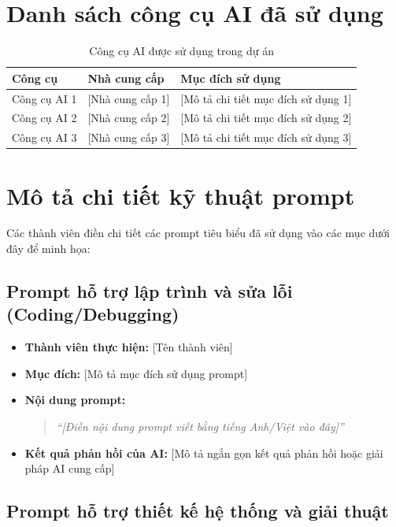 \documentclass[a4paper,12pt]{report}
\begin{document}
\section{Danh sách công cụ AI đã sử dụng}

\begin{table}[H]
\centering
\caption{Công cụ AI được sử dụng trong dự án}
\begin{tabular}{l l p{7cm}}
\toprule
\textbf{Công cụ} & \textbf{Nhà cung cấp} & \textbf{Mục đích sử dụng} \\
\midrule
Công cụ AI 1 & [Nhà cung cấp 1] & [Mô tả chi tiết mục đích sử dụng 1] \\
Công cụ AI 2 & [Nhà cung cấp 2] & [Mô tả chi tiết mục đích sử dụng 2] \\
Công cụ AI 3 & [Nhà cung cấp 3] & [Mô tả chi tiết mục đích sử dụng 3] \\
\bottomrule
\end{tabular}
\end{table}

\section{Mô tả chi tiết kỹ thuật prompt}

Các thành viên điền chi tiết các prompt tiêu biểu đã sử dụng vào các mục dưới đây để minh họa:

\subsection{Prompt hỗ trợ lập trình và sửa lỗi (Coding/Debugging)}

\begin{itemize}
    \item \textbf{Thành viên thực hiện:} [Tên thành viên]
    \item \textbf{Mục đích:} [Mô tả mục đích sử dụng prompt]
    \item \textbf{Nội dung prompt:}
    \begin{quote}
    \textit{``[Điền nội dung prompt viết bằng tiếng Anh/Việt vào đây]''}
    \end{quote}
    \item \textbf{Kết quả phản hồi của AI:} [Mô tả ngắn gọn kết quả phản hồi hoặc giải pháp AI cung cấp]
\end{itemize}

\subsection{Prompt hỗ trợ thiết kế hệ thống và giải thuật}
\end{document}
